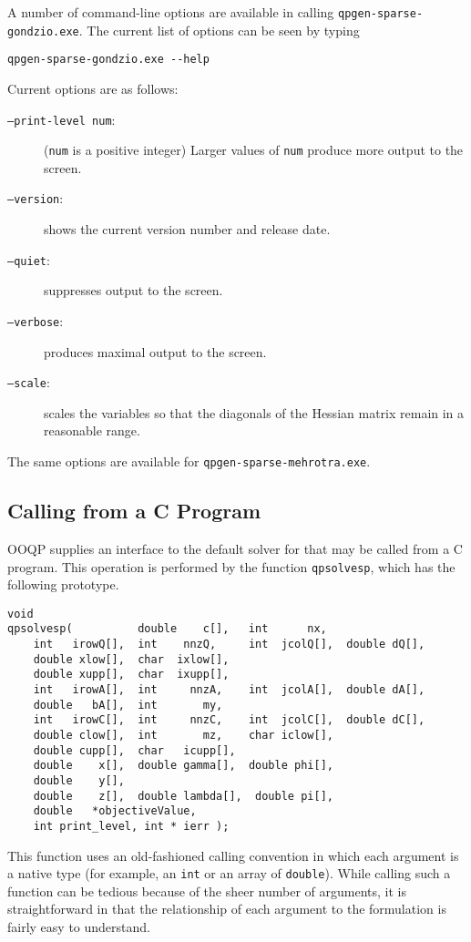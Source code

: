 A number of command-line options are available in calling
\texttt{qpgen-sparse-gondzio.exe}. The current list of options can be
seen by typing 
\begin{verbatim}
qpgen-sparse-gondzio.exe --help
\end{verbatim}
Current options are as follows:
\begin{description}
\item[{\tt --print-level num}:] (\texttt{num} is a positive
  integer)  Larger values of \texttt{num} produce more output to the
  screen.

\item[{\tt --version}:]  shows the current version number and release date.

\item[{\tt --quiet}:] suppresses output  to the screen.

\item[{\tt --verbose}:] produces maximal output to the screen.
  
\item[{\tt --scale}:] scales the variables so that the diagonals of the
  Hessian matrix remain in a reasonable range.
\end{description}

The same options are available for \texttt{qpgen-sparse-mehrotra.exe}.

\subsection{Calling from a C Program}
\label{embedding-c}

OOQP supplies an interface to the default solver for  that
may be called from a C program.  This operation is performed by the
function \texttt{qpsolvesp}, which has the following prototype.
\begin{verbatim}
void 
qpsolvesp(          double    c[],   int      nx,
    int   irowQ[],  int    nnzQ,     int  jcolQ[],  double dQ[],
    double xlow[],  char  ixlow[], 
    double xupp[],  char  ixupp[],
    int   irowA[],  int     nnzA,    int  jcolA[],  double dA[],
    double   bA[],  int       my,
    int   irowC[],  int     nnzC,    int  jcolC[],  double dC[],
    double clow[],  int       mz,    char iclow[],
    double cupp[],  char   icupp[],
    double    x[],  double gamma[],  double phi[],
    double    y[],
    double    z[],  double lambda[],  double pi[],
    double   *objectiveValue,
    int print_level, int * ierr );
\end{verbatim}
This function uses an old-fashioned calling convention in which each
argument is a native type (for example, an {\tt int} or an array of
{\tt double}). While calling such a function can be tedious because of
the sheer number of arguments, it is straightforward in that the
relationship of each argument to the formulation  is
fairly easy to understand.

